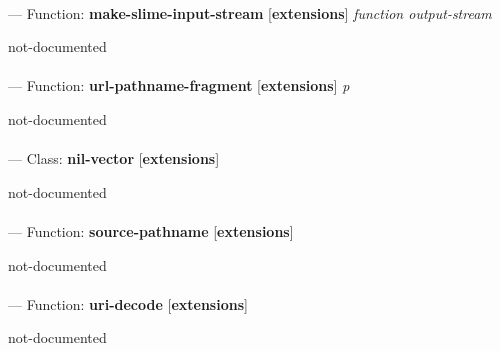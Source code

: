 \paragraph{}
\label{EXTENSIONS:MAKE-SLIME-INPUT-STREAM}
--- Function: \textbf{make-slime-input-stream} [\textbf{extensions}] \textit{function output-stream}

\begin{adjustwidth}{5em}{5em}
not-documented
\end{adjustwidth}

\paragraph{}
\label{EXTENSIONS:URL-PATHNAME-FRAGMENT}
--- Function: \textbf{url-pathname-fragment} [\textbf{extensions}] \textit{p}

\begin{adjustwidth}{5em}{5em}
not-documented
\end{adjustwidth}

\paragraph{}
\label{EXTENSIONS:NIL-VECTOR}
--- Class: \textbf{nil-vector} [\textbf{extensions}] \textit{}

\begin{adjustwidth}{5em}{5em}
not-documented
\end{adjustwidth}

\paragraph{}
\label{EXTENSIONS:SOURCE-PATHNAME}
--- Function: \textbf{source-pathname} [\textbf{extensions}] \textit{}

\begin{adjustwidth}{5em}{5em}
not-documented
\end{adjustwidth}

\paragraph{}
\label{EXTENSIONS:URI-DECODE}
--- Function: \textbf{uri-decode} [\textbf{extensions}] \textit{}

\begin{adjustwidth}{5em}{5em}
not-documented
\end{adjustwidth}

